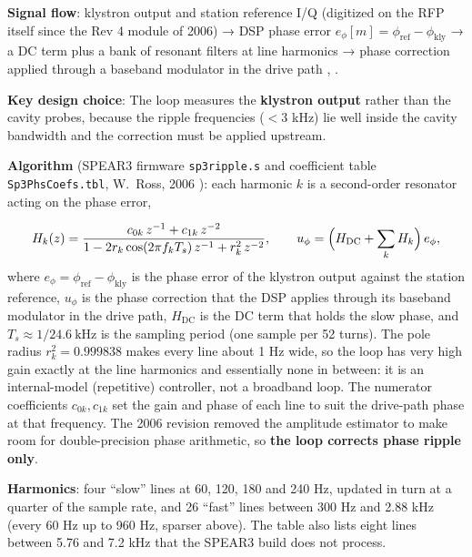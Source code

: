 \textbf{Signal flow}: klystron output and station reference I/Q (digitized on the RFP itself since the Rev 4 module of 2006) → DSP phase error \(e_\phi[m] = \phi_\text{ref} - \phi_\text{kly}\) → a DC term plus a bank of resonant filters at line harmonics → phase correction applied through a baseband modulator in the drive path , .

\textbf{Key design choice}: The loop measures the \textbf{klystron output} rather than the cavity probes, because the ripple frequencies (\(< 3\) kHz) lie well inside the cavity bandwidth and the correction must be applied upstream.

\textbf{Algorithm} (SPEAR3 firmware \texttt{sp3ripple.s} and coefficient table \texttt{Sp3PhsCoefs.tbl}, W.~Ross, 2006 ): each harmonic \(k\) is a second-order resonator acting on the phase error,

\begin{equation}\label{eq:ripple-res}
H_k(z) = \frac{c_{0k}\,z^{-1} + c_{1k}\,z^{-2}}{1 - 2r_k\cos(2\pi f_k T_s)\,z^{-1} + r_k^2\,z^{-2}},
\qquad
u_\phi = \Bigl(H_\text{DC} + \sum_k H_k\Bigr)\,e_\phi,
\end{equation}
where \(e_\phi = \phi_\text{ref} - \phi_\text{kly}\) is the phase error of the klystron output against the station reference, \(u_\phi\) is the phase correction that the DSP applies through its baseband modulator in the drive path, \(H_\text{DC}\) is the DC term that holds the slow phase, and \(T_s \approx 1/\qty{24.6}{\kilo\hertz}\) is the sampling period (one sample per 52 turns). The pole radius \(r_k^2 = 0.999838\) makes every line about 1 Hz wide, so the loop has very high gain exactly at the line harmonics and essentially none in between: it is an internal-model (repetitive) controller, not a broadband loop. The numerator coefficients \(c_{0k}, c_{1k}\) set the gain and phase of each line to suit the drive-path phase at that frequency. The 2006 revision removed the amplitude estimator to make room for double-precision phase arithmetic, so \textbf{the loop corrects phase ripple only}.

\textbf{Harmonics}: four ``slow'' lines at 60, 120, 180 and 240 Hz, updated in turn at a quarter of the sample rate, and 26 ``fast'' lines between 300 Hz and 2.88 kHz (every 60 Hz up to 960 Hz, sparser above). The table also lists eight lines between 5.76 and 7.2 kHz that the SPEAR3 build does not process.

